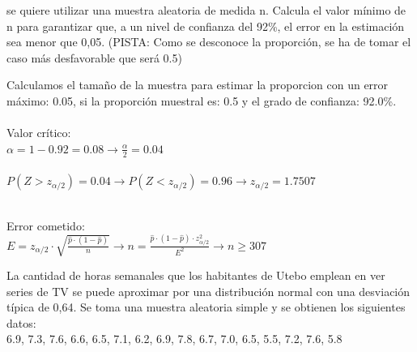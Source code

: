 \documentclass[spanish, 11pt]{exam}
\begin{document}
\begin{questions}
se quiere
utilizar una muestra aleatoria de medida n. Calcula el valor mínimo de n para garantizar que, a un nivel de
confianza del 92\%, el error en la estimación sea menor que 0,05. (PISTA: Como se desconoce la proporción, 
se ha de tomar el caso más desfavorable que será 0.5) \begin{solution}   Calculamos el tamaño de la muestra para estimar la proporcion con un error máximo: 0.05, si la proporción muestral es: 0.5 y el grado de confianza: 92.0\%. \\ \\ Valor crítico: \\ $\alpha=1-0.92=0.08\to \frac{\alpha}{2}=0.04$ \\ \\ $P(Z>z_{\alpha/2})=0.04\to P(Z<z_{\alpha/2})=0.96 \to z_{\alpha/2} =1.7507$ \\ 
     \\
    Error cometido: \\ $E=z_{\alpha / 2}\cdot \sqrt{\frac{\widehat{p}\cdot\left(1-\widehat{p} \right)}{n}} \to n =\frac{\widehat{p}\cdot\left(1-\widehat{p} \right)\cdot z_{\alpha / 2}^2}{E^2} \to n \geq307$ \\    \end{solution}\question La cantidad de horas semanales que los habitantes de Utebo emplean en ver series de TV
se puede aproximar
por una distribución normal con una desviación típica de 0,64. Se toma una muestra aleatoria simple y se
obtienen los siguientes datos: \\
6.9, 7.3, 7.6, 6.6, 6.5, 7.1, 6.2, 6.9, 7.8, 6.7, 7.0, 6.5, 5.5, 7.2, 7.6, 5.8 \\


\end{questions}
\end{document}
